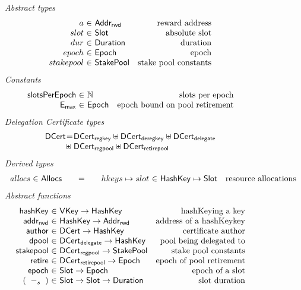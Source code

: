 \begin{figure}
  \emph{Abstract types}
  \begin{equation*}
    \begin{array}{r@{~\in~}lr}
      a & \AddrRWD & \text{reward address} \\
      slot & \Slot & \text{absolute slot}\\
      dur & \Duration & \text{duration}\\
      epoch & \Epoch & \text{epoch} \\
      stakepool & \StakePool & \text{stake pool constants}
    \end{array}
  \end{equation*}
  \emph{Constants}
  \begin{equation*}
    \begin{array}{r@{~\in~}lr}
      \slotsPer & \mathbb{N} & \text{slots per epoch} \\
      \emax & \Epoch & \text{epoch bound on pool retirement} \\
    \end{array}
  \end{equation*}
  \emph{Delegation Certificate types}
  \begin{equation*}
  \begin{array}{r@{}c@{}l}
    \DCert &=& \DCertRegKey \uniondistinct \DCertDeRegKey \uniondistinct \DCertDeleg \\
                &\hfill\uniondistinct\;& \DCertRegPool \uniondistinct \DCertRetirePool
  \end{array}
  \end{equation*}
  \emph{Derived types}
  \begin{equation*}
    \begin{array}{r@{~\in~}l@{\qquad=\qquad}r@{~\in~}lr}
      \var{allocs}
      & \Allocs
      & hkeys \mapsto slot
      & \HashKey \mapsto \Slot
      & \text{resource allocations}
    \end{array}
  \end{equation*}
  \emph{Abstract functions}
  \begin{equation*}
  \begin{array}{r@{~\in~}lr}
  \fun{hashKey} & \VKey \to \HashKey
  & \text{hashKeying a key}
  \\
  \fun{addr_{rwd}} & \HashKey \to \AddrRWD
  & \text{address of a hashKeykey}
  \\
  \fun{author} & \DCert \to \HashKey
  & \text{certificate author}
  \\
  \fun{dpool} & \DCertDeleg \to \HashKey
  & \text{pool being delegated to}
  \\
  \fun{stakepool} & \DCertRegPool \to \StakePool
  & \text{stake pool constants}
  \\
  \fun{retire} & \DCertRetirePool \to \Epoch
  & \text{epoch of pool retirement}
  \\
  \fun{epoch} & \Slot \to \Epoch
  & \text{epoch of a slot}
  \\
    (\slotminus{}{}) & \Slot \to \Slot \to \Duration
  & \text{slot duration}
  \end{array}
  \end{equation*}


\end{figure}

